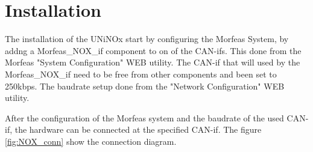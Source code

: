 \section{Installation}
The installation of the UNiNOx start by configuring the Morfeas System, by addng a Morfeas\_NOX\_if component to on of the CAN-ifs.
This done from the Morfeas "System Configuration" WEB utility.
The CAN-if that will used by the Morfeas\_NOX\_if need to be free from other components and been set to 250kbps.
The baudrate setup done from the "Network Configuration" WEB utility.

After the configuration of the Morfeas system and the baudrate of the used CAN-if, the hardware can be connected at the specified CAN-if. 
The figure \ref{fig:NOX_conn} show the connection diagram.  